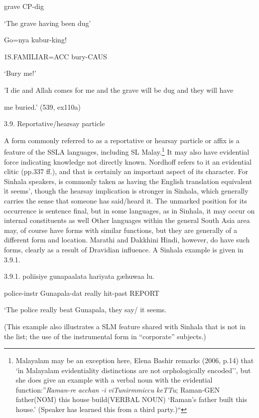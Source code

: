\documentclass[letterpaper]{article}
\begin{document}
  grave CP-dig

  `The grave having been dug'

  Go=nya  kubur-king!

  1S.FAMILIAR=ACC bury-CAUS

  `Bury me!'

'I die and Allah comes for me and the grave will be dug and they will have

 me buried.' (539, ex110a)

3.9. Reportative/hearsay particle 

 A form commonly referred to as a reportative or hearsay particle or affix is a feature of the SSLA languages, including SL Malay.\footnote{Malayalam
  may be an exception here, Elena Bashir remarks (2006, p.14) that `ìn Malayalam evidentiality distinctions are not orphologically encoded'', but she does give an example with a verbal noun with the evidential function:''\textit{R}\textit{a{\textlnot}}\textit{man-}\textit{r}\textit{e} \textit{acchan }\textit{-i{\textlnot}} \textit{v}\textit{i{\textlnot}}\textit{Tunirmmiccu} \textit{k}\textit{e{\textlnot}}\textit{TTu}; Raman-GEN father(NOM) this house build(VERBAL NOUN) `Raman's father built this house.' (Speaker has learned this from a third party.)``} It may also have evidential force indicating knowledge not directly known. Nordhoff refers to it an evidential clitic  (pp.337 ff.), and that is certainly an important aspect of its character. For Sinhala speakers, is commonly taken as having the English translation equivalent ìt seems', though the hearsay implication is stronger in Sinhala, which generally carries the sense that someone has said/heard it. The unmarked position for its occurrence is sentence final, but in some languages, as in Sinhala, it may occur on internal constituents as well Other languages within the general South Asia area may, of course have forms with similar functions, but they are generally of a different form and location. Marathi and Dakkhini Hindi, however, do have such forms, clearly as a result of Dravidian influence. A Sinhala example is given in 3.9.1.

3.9.1. 
\ea
\gll poliisiye{\textcopyright} gunapaalat{\dag}a hariyat{\dag}a g{\ae}huwaa lu.

   police-instr  Gunapala-dat really hit-past REPORT

  `The police really beat Gunapala, they say/ it seems. 

(This example also illustrates a SLM feature shared with Sinhala that is not in the list; the use of the instrumental form in ``corporate'' subjects.)
\end{document}
